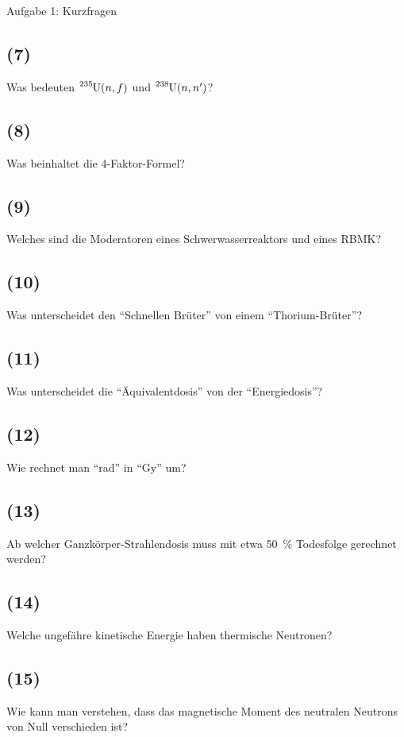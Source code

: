 \begin{aufgabe}{Aufgabe 1: Kurzfragen}
    \subsection{(7)}
    Was bedeuten $\ce{^235U}(n,f)$ und $\ce{^238U}(n,n')$?

    \subsection{(8)}
    Was beinhaltet die 4-Faktor-Formel?

    \subsection{(9)}
    Welches sind die Moderatoren eines Schwerwasserreaktors und eines RBMK?

    \subsection{(10)}
    Was unterscheidet den \enquote{Schnellen Brüter} von einem \enquote{Thorium-Brüter}?

    \subsection{(11)}
    Was unterscheidet die \enquote{Äquivalentdosis} von der \enquote{Energiedosis}?

    \subsection{(12)}
    Wie rechnet man \enquote{\unit{{rad}}} in \enquote{\unit{{Gy}}} um?

    \subsection{(13)}
    Ab welcher Ganzkörper-Strahlendosis muss mit etwa \SI{50}{\percent} Todesfolge gerechnet werden?

    \subsection{(14)}
    Welche ungefähre kinetische Energie haben thermische Neutronen?

    \subsection{(15)}
    Wie kann man verstehen, dass das magnetische Moment des neutralen Neutrons von Null verschieden ist?


\end{aufgabe}
